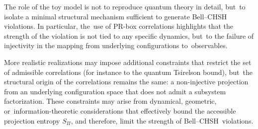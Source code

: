 \documentclass[quantumrep,article,accept,pdftex,oneauthor]{Definitions/mdpi}
\theoremstyle{remark}
\begin{document}
    The role of the toy model is not to reproduce quantum theory in detail, but~to
    isolate a minimal structural mechanism sufficient to generate Bell--CHSH violations.
    In particular, the~use of PR-box correlations highlights that the strength of the
    violation is not tied to any specific dynamics, but~to the failure of injectivity
    in the mapping from underlying configurations to~observables.

    More realistic realizations may impose additional constraints that restrict the set
    of admissible correlations (for instance to the quantum Tsirelson bound), but~the
    structural origin of the correlations remains the same: a non-injective projection
    from an underlying configuration space that does not admit a subsystem factorization.
    These constraints may arise from dynamical, geometric, or~information-theoretic
    considerations that effectively bound the accessible projection entropy $S_{\Pi}$,
    and therefore, limit the strength of Bell--CHSH~violations.
\end{document}
